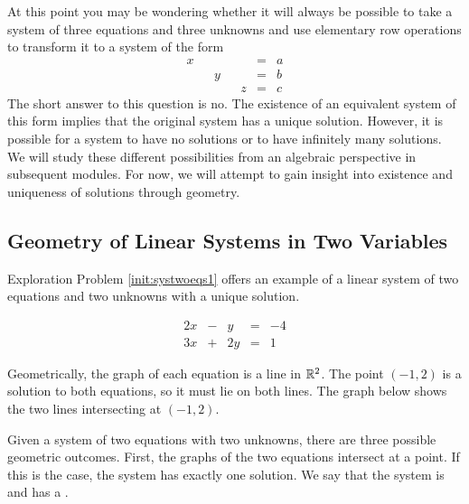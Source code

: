\documentclass{ximera}
\begin{document}
At this point you may be wondering whether it will always be possible to take a system of three equations and three unknowns and use elementary row operations to transform it to a system of the form
$$\begin{array}{ccccccc}
      x & &&&&= &a \\
	 & &y&&&=&b\\
     & &&&z&=&c
    \end{array}$$
The short answer to this question is no.  The existence of an equivalent system of this form implies that the original system has a unique solution.  However, it is possible for a system to have no solutions or to have infinitely many solutions.  We will study these different possibilities from an algebraic perspective in subsequent modules.  For now, we will attempt to gain insight into existence and uniqueness of solutions through geometry.     

\subsection*{Geometry of Linear Systems in Two Variables}
Exploration Problem \ref{init:systwoeqs1} offers an example of a linear system of two equations and two unknowns with a unique solution.  

$$\begin{array}{ccccc}
      2x& -&y&=&-4\\
      3x & +&2y&= &1 
    \end{array}$$

Geometrically, the graph of each equation is a line in $\mathbb{R}^2$.  The point $(-1, 2)$ is a solution to both equations, so it must lie on both lines.
  The graph below shows the two lines intersecting at $(-1, 2)$.    
    
\begin{image}[2in]
\end{image}

Given a system of two equations with two unknowns, there are three possible geometric outcomes.  First, the graphs of the two equations intersect at a point.  If this is the case, the system has exactly one solution. We say that the system is  and has a .  
\end{document}
